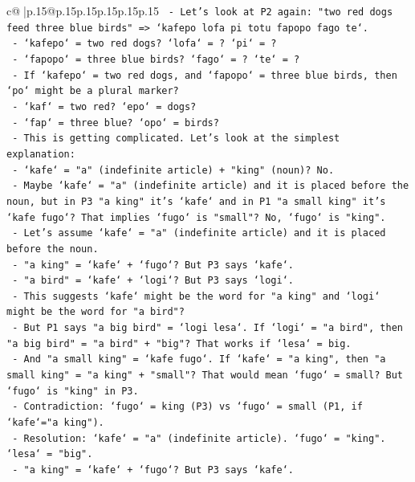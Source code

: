 \documentclass{article}
\begin{document}
{\begin{supertabular}{c@{$\;$}|p{.15\linewidth}@{}p{.15\linewidth}p{.15\linewidth}p{.15\linewidth}p{.15\linewidth}p{.15\linewidth}}
{{{\texttt{      {-} Let's look at P2 again: "two red dogs feed three blue birds" => `kafepo lofa pi totu fapopo fago te`.} \\
\texttt{        {-} `kafepo` = two red dogs? `lofa` = ? `pi` = ?} \\
\texttt{        {-} `fapopo` = three blue birds? `fago` = ? `te` = ?} \\
\texttt{        {-} If `kafepo` = two red dogs, and `fapopo` = three blue birds, then `po` might be a plural marker?} \\
\texttt{        {-} `kaf` = two red? `epo` = dogs?} \\
\texttt{        {-} `fap` = three blue? `opo` = birds?} \\
\texttt{        {-} This is getting complicated. Let's look at the simplest explanation:} \\
\texttt{          {-} `kafe` = "a" (indefinite article) + "king" (noun)? No.} \\
\texttt{          {-} Maybe `kafe` = "a" (indefinite article) and it is placed before the noun, but in P3 "a king" it's `kafe` and in P1 "a small king" it's `kafe fugo`? That implies `fugo` is "small"? No, `fugo` is "king".} \\
\texttt{          {-} Let's assume `kafe` = "a" (indefinite article) and it is placed before the noun.} \\
\texttt{            {-} "a king" = `kafe` + `fugo`? But P3 says `kafe`.} \\
\texttt{            {-} "a bird" = `kafe` + `logi`? But P3 says `logi`.} \\
\texttt{          {-} This suggests `kafe` might be the word for "a king" and `logi` might be the word for "a bird"?} \\
\texttt{          {-} But P1 says "a big bird" = `logi lesa`. If `logi` = "a bird", then "a big bird" = "a bird" + "big"? That works if `lesa` = big.} \\
\texttt{          {-} And "a small king" = `kafe fugo`. If `kafe` = "a king", then "a small king" = "a king" + "small"? That would mean `fugo` = small? But `fugo` is "king" in P3.} \\
\texttt{          {-} Contradiction: `fugo` = king (P3) vs `fugo` = small (P1, if `kafe`="a king").} \\
\texttt{          {-} Resolution: `kafe` = "a" (indefinite article). `fugo` = "king". `lesa` = "big".} \\
\texttt{            {-} "a king" = `kafe` + `fugo`? But P3 says `kafe`.} \\
}}}
\end{supertabular}}
\end{document}
